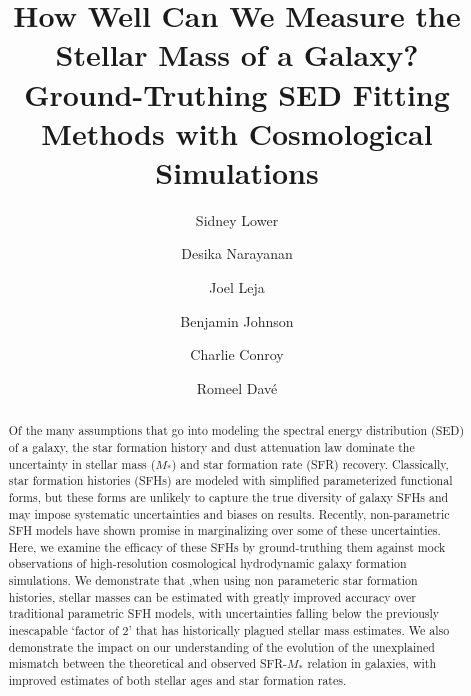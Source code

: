 \documentclass[twocolumn]{aastex62}
\begin{document}
\title{How Well Can We Measure the Stellar Mass of a Galaxy? \\ Ground-Truthing SED Fitting Methods with Cosmological Simulations
}



\author{Sidney Lower}

\author{Desika Narayanan}
\author{Joel Leja}
\author{Benjamin Johnson}
\author{Charlie Conroy}
\author{Romeel Dav{\'{e}}}


\begin{abstract}

Of the many assumptions that go into modeling the spectral energy distribution (SED) of a galaxy, the star formation history and dust attenuation law dominate the uncertainty in stellar mass ($M_*$) and star formation rate (SFR) recovery. Classically, star formation histories (SFHs) are modeled with simplified parameterized functional forms, but these forms are unlikely to capture the true diversity of galaxy SFHs and may impose systematic uncertainties and biases on results. Recently, non-parametric SFH models have shown promise in marginalizing over some of these uncertainties. Here, we examine the efficacy of these SFHs by ground-truthing them against mock observations of high-resolution cosmological hydrodynamic galaxy formation simulations. We demonstrate that ,when using non parameteric star formation histories, stellar masses can be estimated with greatly improved accuracy over traditional parametric SFH models, with uncertainties falling below the previously inescapable ‘factor of 2’ that has historically plagued stellar mass estimates. We also demonstrate the impact on our understanding of the evolution of the unexplained mismatch between the theoretical and observed SFR-$M_*$ relation in galaxies, with improved estimates of both stellar ages and star formation rates. 

\end{abstract}
\end{document}
